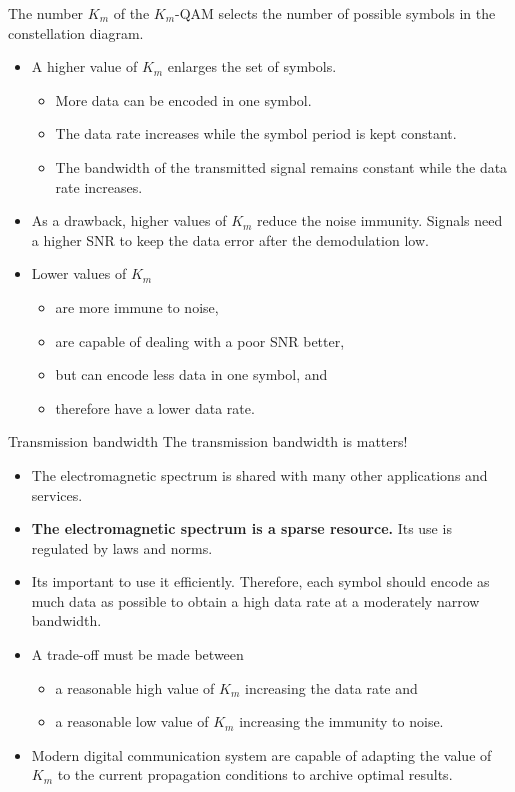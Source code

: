 \begin{refsection}
The number $K_m$ of the $K_m$-\acs{QAM} selects the number of possible symbols in the constellation diagram.
\begin{itemize}
	\item A higher value of $K_m$ enlarges the set of symbols.
	\begin{itemize}
		\item More data can be encoded in one symbol.
		\item The data rate increases while the symbol period is kept constant.
		\item The bandwidth of the transmitted signal remains constant while the data rate increases.
	\end{itemize}
	\item As a drawback, higher values of $K_m$ reduce the noise immunity. Signals need a higher \ac{SNR} to keep the data error after the demodulation low.
	\item Lower values of $K_m$
	\begin{itemize}
		\item are more immune to noise,
		\item are capable of dealing with a poor \ac{SNR} better,
		\item but can encode less data in one symbol, and
		\item therefore have a lower data rate.
	\end{itemize}
\end{itemize}

\begin{excursus}{Transmission bandwidth}
	The transmission bandwidth is matters!
	\begin{itemize}
		\item The electromagnetic spectrum is shared with many other applications and services.
		\item \textbf{The electromagnetic spectrum is a sparse resource.} Its use is regulated by laws and norms.
		\item Its important to use it efficiently. Therefore, each symbol should encode as much data as possible to obtain a high data rate at a moderately narrow bandwidth.
		\item A trade-off must be made between
		\begin{itemize}
			\item a reasonable high value of $K_m$ increasing the data rate and
			\item a reasonable low value of $K_m$ increasing the immunity to noise.
		\end{itemize}
		\item Modern digital communication system are capable of adapting the value of $K_m$ to the current propagation conditions to archive optimal results.
	\end{itemize}


\end{excursus}
\end{refsection}
